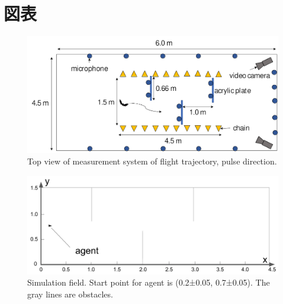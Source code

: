 \documentclass[../main]{subfiles}
\begin{document}
\newpage
\chapter*{図表}

\renewcommand{\figurename}{Fig. } %
\renewcommand{\tablename}{Table } %


\begin{figure}[H]
  \centering
  \includegraphics[width=12cm]{figures/top_view_measure.png}
  \caption{
    Top view of measurement system of flight trajectory,
    pulse direction.
  }\label{fig:top_view_measure}
\end{figure}


\newpage
{}
\begin{figure}[H]
  \centering
  \vfill
  \includegraphics[width=14cm]{figures/simulation_field.png}
  \caption{
    Simulation field.
    Start point for agent is (0.2±0.05, 0.7±0.05).
    The gray lines are obstacles.
  }\label{fig:simulation_field}
\end{figure}
\end{document}
